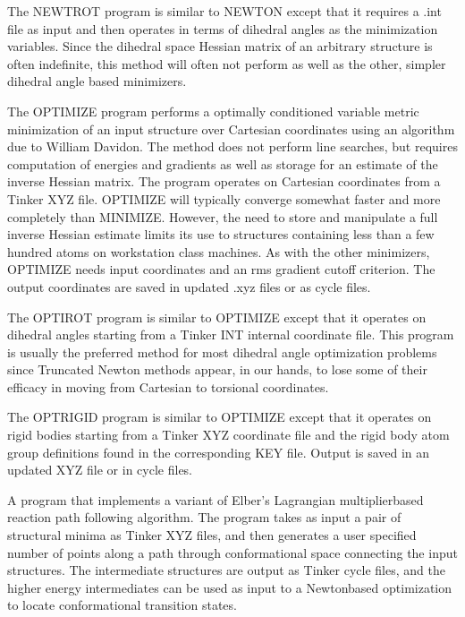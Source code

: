 \documentclass[letterpaper,11pt,english]{sphinxmanual}
\begin{document}

The NEWTROT program is similar to NEWTON except that it requires a .int file as input and then operates in terms of dihedral angles as the minimization variables. Since the dihedral space Hessian matrix of an arbitrary structure is often indefinite, this method will often not perform as well as the other, simpler dihedral angle based minimizers.


The OPTIMIZE program performs a optimally conditioned variable metric minimization of an input structure over Cartesian coordinates using an algorithm due to William Davidon. The method does not perform line searches, but requires computation of energies and gradients as well as storage for an estimate of the inverse Hessian matrix. The program operates on Cartesian coordinates from a Tinker XYZ file. OPTIMIZE will typically converge somewhat faster and more completely than MINIMIZE. However, the need to store and manipulate a full inverse Hessian estimate limits its use to structures containing less than a few hundred atoms on workstation class machines. As with the other minimizers, OPTIMIZE needs input coordinates and an rms gradient cutoff criterion. The output coordinates are saved in updated .xyz files or as cycle files.


The OPTIROT program is similar to OPTIMIZE except that it operates on dihedral angles starting from a Tinker INT internal coordinate file. This program is usually the preferred method for most dihedral angle optimization problems since Truncated Newton methods appear, in our hands, to lose some of their efficacy in moving from Cartesian to torsional coordinates.


The OPTRIGID program is similar to OPTIMIZE except that it operates on rigid bodies starting from a Tinker XYZ coordinate file and the rigid body atom group definitions found in the corresponding KEY file. Output is saved in an updated XYZ file or in cycle files.


A program that implements a variant of Elber’s Lagrangian multiplier\sphinxhyphen{}based reaction path following algorithm. The program takes as input a pair of structural minima as Tinker XYZ files, and then generates a user specified number of points along a path through conformational space connecting the input structures. The intermediate structures are output as Tinker cycle files, and the higher energy intermediates can be used as input to a Newton\sphinxhyphen{}based optimization to locate conformational transition states.
\end{document}
